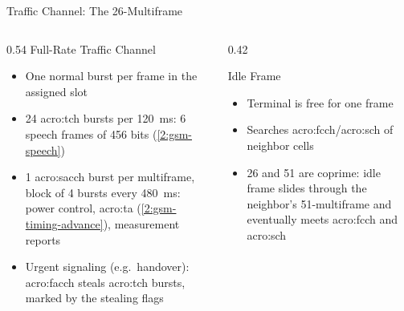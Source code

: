 \begin{frame}{Traffic Channel: The 26-Multiframe}
  \centering
  

  \vspace{0.3em}
  \raggedright
  \begin{columns}[T,onlytextwidth]
    \begin{column}{0.54\textwidth}
      Full-Rate Traffic Channel~\cite{etsi.145.002.v18}
      \begin{itemize}
        \item One normal burst per frame in the assigned slot
        \item 24 \acrshort{acro:tch} bursts per \qty{120}{\milli\second}: 6 speech frames of 456 bits (\cref{2:gsm-speech})
        \item 1 \acrshort{acro:sacch} burst per multiframe, block of 4 bursts every \qty{480}{\milli\second}: power control, \acrshort{acro:ta} (\cref{2:gsm-timing-advance}), measurement reports
        \item Urgent signaling (e.g.\ handover): \acrshort{acro:facch} steals \acrshort{acro:tch} bursts, marked by the stealing flags
      \end{itemize}
    \end{column}
    \begin{column}{0.42\textwidth}
      \begin{block}{Idle Frame}
        \begin{itemize}
          \item Terminal is free for one frame
          \item Searches \acrshort{acro:fcch}/\acrshort{acro:sch} of neighbor cells
          \item 26 and 51 are coprime: idle frame slides through the neighbor's 51-multiframe and eventually meets \acrshort{acro:fcch} and \acrshort{acro:sch}
        \end{itemize}
      \end{block}
    \end{column}
  \end{columns}
\end{frame}

